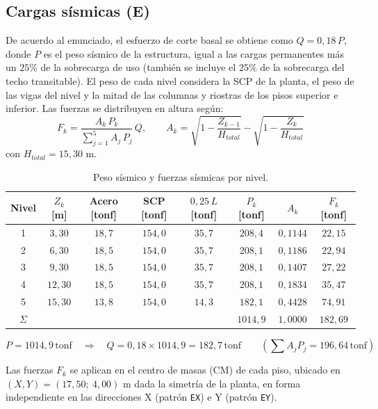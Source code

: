\documentclass[11pt,letterpaper]{article}
\newcommand{\tonf}{\,\mathrm{tonf}}
\begin{document}
\subsection{Cargas sísmicas (E)}
De acuerdo al enunciado, el esfuerzo de corte basal se obtiene como $Q = 0{,}18\,P$, donde $P$ es el peso
sísmico de la estructura, igual a las cargas permanentes más un $25\%$ de la sobrecarga de uso
(también se incluye el $25\%$ de la sobrecarga del techo transitable). El peso de cada nivel considera la
SCP de la planta, el peso de las vigas del nivel y la mitad de las columnas y riostras de los pisos
superior e inferior. Las fuerzas se distribuyen en altura según:
\begin{equation}
F_k = \frac{A_k\,P_k}{\sum_{j=1}^{5} A_j\,P_j}\,Q,
\qquad
A_k = \sqrt{1-\frac{Z_{k-1}}{H_{total}}} - \sqrt{1-\frac{Z_k}{H_{total}}}
\end{equation}
con $H_{total} = 15{,}30$ m.

\begin{table}[H]
\centering
\caption{Peso sísmico y fuerzas sísmicas por nivel.}
\label{tab:sismo}
\begin{tabular}{cccccccc}
\toprule
Nivel & $Z_k$ [m] & Acero [tonf] & SCP [tonf] & $0{,}25\,L$ [tonf] & $P_k$ [tonf] & $A_k$ & $F_k$ [tonf] \\
\midrule
1 & $3{,}30$ & $18{,}7$ & $154{,}0$ & $35{,}7$ & $208{,}4$ & $0{,}1144$ & $22{,}15$ \\
2 & $6{,}30$ & $18{,}5$ & $154{,}0$ & $35{,}7$ & $208{,}1$ & $0{,}1186$ & $22{,}94$ \\
3 & $9{,}30$ & $18{,}5$ & $154{,}0$ & $35{,}7$ & $208{,}1$ & $0{,}1407$ & $27{,}22$ \\
4 & $12{,}30$ & $18{,}5$ & $154{,}0$ & $35{,}7$ & $208{,}1$ & $0{,}1834$ & $35{,}47$ \\
5 & $15{,}30$ & $13{,}8$ & $154{,}0$ & $14{,}3$ & $182{,}1$ & $0{,}4428$ & $74{,}91$ \\
\midrule
$\Sigma$ & & & & & $1014{,}9$ & $1{,}0000$ & $182{,}69$ \\
\bottomrule
\end{tabular}
\end{table}

\[
P = 1014{,}9\tonf \quad\Rightarrow\quad Q = 0{,}18 \times 1014{,}9 = 182{,}7\tonf
\qquad \left(\textstyle\sum A_j P_j = 196{,}64\tonf\right)
\]

Las fuerzas $F_k$ se aplican en el centro de masas (CM) de cada piso, ubicado en
$(X, Y) = (17{,}50;\ 4{,}00)$ m dada la simetría de la planta, en forma
independiente en las direcciones X (patrón \texttt{EX}) e Y (patrón \texttt{EY}).
\end{document}
